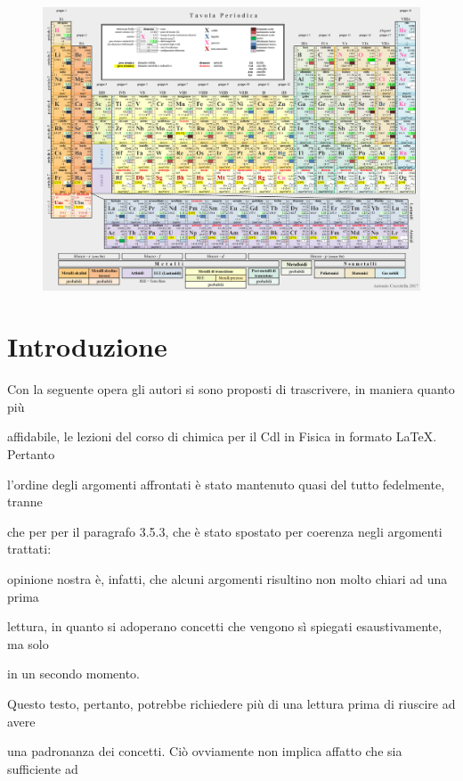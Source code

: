 \documentclass[openany,12pt]{book}%
\newcommand\blankpage{%
    \null
    \thispagestyle{empty}%
    \newpage}
\begin{document}
\begin{figure}[H]
    \includegraphics[angle=90,origin=c]{immagini/tavola periodica.png}
\end{figure}

\afterpage{\blankpage}

\tableofcontents

\chapter*{Introduzione}

Con la seguente opera gli autori si sono proposti di trascrivere, in maniera quanto più

affidabile, le lezioni del corso di chimica per il Cdl in Fisica in formato \LaTeX. Pertanto

l'ordine degli argomenti affrontati è stato mantenuto quasi del tutto fedelmente, tranne

che per per il paragrafo 3.5.3, che è stato spostato per coerenza negli argomenti trattati:

opinione nostra è, infatti, che alcuni argomenti risultino non molto chiari ad una prima

lettura, in quanto si adoperano concetti che vengono sì spiegati esaustivamente, ma solo

in un secondo momento.

\vspace{0.2cm}
Questo testo, pertanto, potrebbe richiedere più di una lettura prima di riuscire ad avere

una padronanza dei concetti. Ciò ovviamente non implica affatto che sia sufficiente ad
\end{document}
